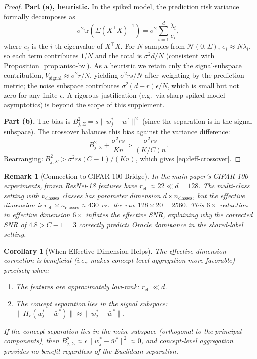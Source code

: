 \documentclass[11pt,a4paper]{article}
\newtheorem{corollary}[theorem]{Corollary}
\newtheorem{remark}[theorem]{Remark}
\newcommand{\tr}{\mathrm{tr}}
\newcommand{\wbar}{\bar{w}}
\begin{document}
\begin{proof}
\textbf{Part (a), heuristic.} In the spiked model, the prediction risk variance formally decomposes as
\[
\sigma^2 \tr(\Sigma(X^\top X)^{-1}) = \sigma^2 \sum_{i=1}^d \frac{\lambda_i}{e_i},
\]
where $e_i$ is the $i$-th eigenvalue of $X^\top X$. For $N$ samples from $\mathcal{N}(0, \Sigma)$, $e_i \approx N\lambda_i$, so each term contributes $1/N$ and the total is $\sigma^2 d/N$ (consistent with Proposition~\ref{prop:aniso-bv}). As a heuristic we retain only the signal-subspace contribution, $V_{\mathrm{signal}} \approx \sigma^2 r / N$, yielding $\sigma^2 r s / N$ after weighting by the prediction metric; the noise subspace contributes $\sigma^2(d-r)\epsilon/N$, which is small but not zero for any finite $\epsilon$. A rigorous justification (e.g.\ via sharp spiked-model asymptotics) is beyond the scope of this supplement.

\textbf{Part (b).} The bias is $B_{j,\Sigma}^2 = s \|w_j^* - \wbar^*\|^2$ (since the separation is in the signal subspace). The crossover balances this bias against the variance difference:
\[
B_{j,\Sigma}^2 + \frac{\sigma^2 rs}{Kn} > \frac{\sigma^2 rs}{(K/C)n}.
\]
Rearranging: $B_{j,\Sigma}^2 > \sigma^2 rs(C-1)/(Kn)$, which gives \eqref{eq:deff-crossover}.
\end{proof}

\begin{remark}[Connection to CIFAR-100 Bridge]
In the main paper's CIFAR-100 experiments, frozen ResNet-18 features have $r_{\mathrm{eff}} \approx 22 \ll d = 128$. The multi-class setting with $n_{\mathrm{classes}}$ classes has parameter dimension $d \times n_{\mathrm{classes}}$, but the effective dimension is $r_{\mathrm{eff}} \times n_{\mathrm{classes}} \approx 430$ vs.\ the raw $128 \times 20 = 2560$. This $6\times$ reduction in effective dimension $6\times$ inflates the effective SNR, explaining why the corrected SNR of $4.8 > C-1 = 3$ correctly predicts Oracle dominance in the shared-label setting.
\end{remark}

\begin{corollary}[When Effective Dimension Helps]
The effective-dimension correction is beneficial (i.e., makes concept-level aggregation more favorable) precisely when:
\begin{enumerate}[label=(\roman*)]
\item The features are approximately low-rank: $r_{\mathrm{eff}} \ll d$.
\item The concept separation lies in the signal subspace: $\|\Pi_r(w_j^* - \wbar^*)\| \approx \|w_j^* - \wbar^*\|$.
\end{enumerate}
If the concept separation lies in the noise subspace (orthogonal to the principal components), then $B_{j,\Sigma}^2 \approx \epsilon \|w_j^* - \wbar^*\|^2 \approx 0$, and concept-level aggregation provides no benefit regardless of the Euclidean separation.
\end{corollary}
\end{document}
